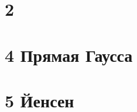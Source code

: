 \documentclass[12pt,pdftex]{article}
\begin{document}
\section*{2}


\section*{4 Прямая Гаусса}


\section*{5 Йенсен}

\end{document}
